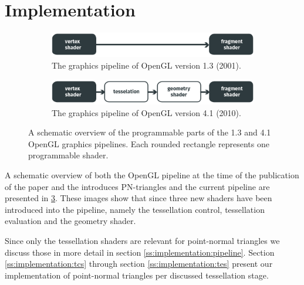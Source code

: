 
\section{Implementation}
\label{s:implementation}

\begin{figure}
	\centering
	\begin{subfigure}{\columnwidth}
		\centering
		\includegraphics[width=\columnwidth]{content/img/implementation/pipeLineOld.png}
		\caption{The graphics pipeline of OpenGL version 1.3 (2001).}
		\label{fig:implementation:pipeline:old}
	\end{subfigure}
	\begin{subfigure}{\columnwidth}
		\centering
		\includegraphics[width=\columnwidth]{content/img/implementation/pipeLineNew.png}
		\caption{The graphics pipeline of OpenGL version 4.1 (2010).}
		\label{fig:implementation:pipeline:new}
	\end{subfigure}	
	\caption{A schematic overview of the programmable parts of the  1.3 and  4.1 OpenGL graphics pipelines. Each rounded rectangle represents one programmable shader.}
	\label{fig:implementation:pipeline}
\end{figure}

A schematic overview of both the OpenGL pipeline at the time of the publication of the paper and the introduces PN-triangles and the current pipeline are presented in \cref{fig:implementation:pipeline}. These images show that since \citeyear{vlachos2001curved} three new shaders have been introduced into the pipeline, namely the tessellation control, tessellation evaluation and the geometry shader. 

Since only the tessellation shaders are relevant for point-normal triangles we discuss those in more detail in section \ref{ss:implementation:pipeline}. Section \ref{ss:implementation:tcs} through section \ref{ss:implementation:tes} present our implementation of point-normal triangles per discussed tessellation stage. 

